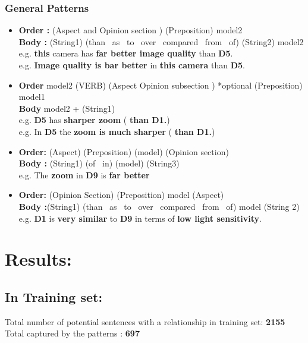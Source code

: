 \documentclass[12pt]{article}
\begin{document}
 \subsubsection{ General Patterns}
 \begin{itemize}
 \item \textbf{Order :}  (Aspect and Opinion section ) (Preposition) model2  \\
      \textbf{Body :}   (String1) (than   \textbar\ as   \textbar\  to  \textbar\ over   \textbar\  compared  \textbar\ from  \textbar\  of) (String2) model2\\
 \noindent
    e.g. \textbf{this} camera has\textbf{ far better image quality} than \textbf{D5}.\\
    e.g. \textbf{Image quality is bar better} in \textbf{ this camera} than \textbf{D5}.
 \item \textbf{Order} model2  (VERB)  (Aspect Opinion subsection )   *optional (Preposition) model1 \\
 \textbf{ Body}    model2 + (String1) \\
e.g. \textbf{D5} has \textbf{sharper zoom} (  \textbf{than D1.}) \\
e.g. In \textbf{D5} the \textbf{ zoom is much sharper} (  \textbf{than D1.})
\item \textbf{Order:} (Aspect) (Preposition) (model)  (Opinion section) \\
 \textbf{Body :}  (String1) (of  \textbar\ in)  (model) (String3) \\
e.g. The \textbf{zoom} in\textbf{ D9} is  \textbf{far better}
\item \textbf{Order:} (Opinion Section)  (Preposition) model (Aspect) \\
 \textbf{Body :}(String1) (than  \textbar\  as  \textbar\  to  \textbar\  over  \textbar\  compared  \textbar\  from  \textbar\  of)  model (String 2)  \\
e.g.\textbf{ D1} is   \textbf{very similar} to\textbf{  D9} in terms of \textbf{low light sensitivity}.
\end{itemize}

\section{Results:}
\subsection{In Training set:}
Total number of potential sentences with a relationship in training set: \textbf{2155} \\
Total captured by the patterns : \textbf{697} \\
\end{document}
